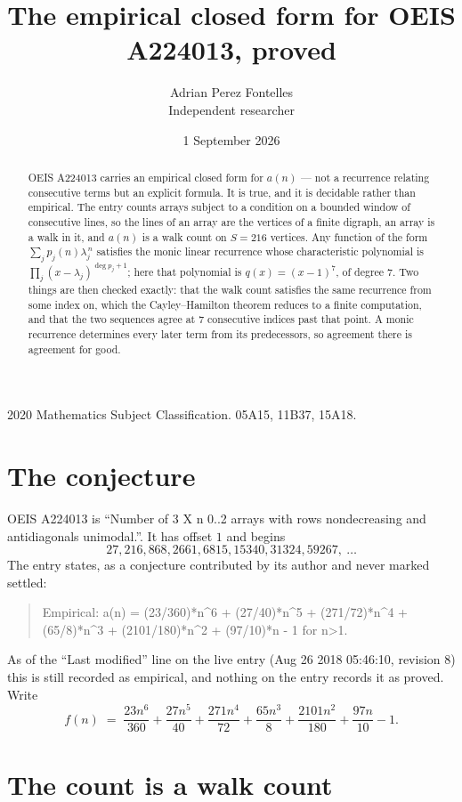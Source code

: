 \documentclass[11pt,a4paper]{article}
\title{The empirical closed form for OEIS A224013, proved}
\author{Adrian Perez Fontelles\\ \small Independent researcher}
\date{1 September 2026}
\theoremstyle{plain}
\theoremstyle{definition}
\begin{document}
\maketitle

\begin{abstract}
OEIS A224013 carries an empirical closed form for $a(n)$ --- not a recurrence relating
consecutive terms but an explicit formula. It is true, and it is decidable rather than
empirical. The entry counts arrays subject to a condition on a bounded window of consecutive lines, so the lines of an array are the
vertices of a finite digraph, an array is a walk in it, and $a(n)$ is a walk count on
$S=216$ vertices. Any function of the form $\sum_j p_j(n)\lambda_j^{\,n}$ satisfies the
monic linear recurrence whose characteristic polynomial is
$\prod_j(x-\lambda_j)^{\deg p_j+1}$; here that polynomial is $q(x)=(x-1)^{7}$, of degree
$7$. Two things are then checked exactly: that the walk count satisfies the same
recurrence from some index on, which the Cayley--Hamilton theorem reduces to a finite
computation, and that the two sequences agree at $7$ consecutive indices past that
point. A monic recurrence determines every later term from its predecessors, so agreement
there is agreement for good.
\end{abstract}

\noindent\small 2020 Mathematics Subject Classification. 05A15, 11B37, 15A18.\normalsize

\section{The conjecture}

OEIS A224013 is ``Number of 3 X n 0..2 arrays with rows nondecreasing and antidiagonals unimodal.''. It has offset $1$ and begins
\[
27, 216, 868, 2661, 6815, 15340, 31324, 59267,\ \dots
\]
The entry states, as a conjecture contributed by its author and never marked settled:
\begin{quote}
Empirical: a(n) = (23/360)*n\^{}6 + (27/40)*n\^{}5 + (271/72)*n\^{}4 + (65/8)*n\^{}3 + (2101/180)*n\^{}2 + (97/10)*n - 1 for n>1.
\end{quote}
As of the ``Last modified'' line on the live entry (Aug 26 2018 05:46:10, revision 8) this is still
recorded as empirical, and nothing on the entry records it as proved. Write
\[
f(n)\;=\;\frac{23 n^{6}}{360} + \frac{27 n^{5}}{40} + \frac{271 n^{4}}{72} + \frac{65 n^{3}}{8} + \frac{2101 n^{2}}{180} + \frac{97 n}{10} - 1.
\]

\section{The count is a walk count}
\end{document}
